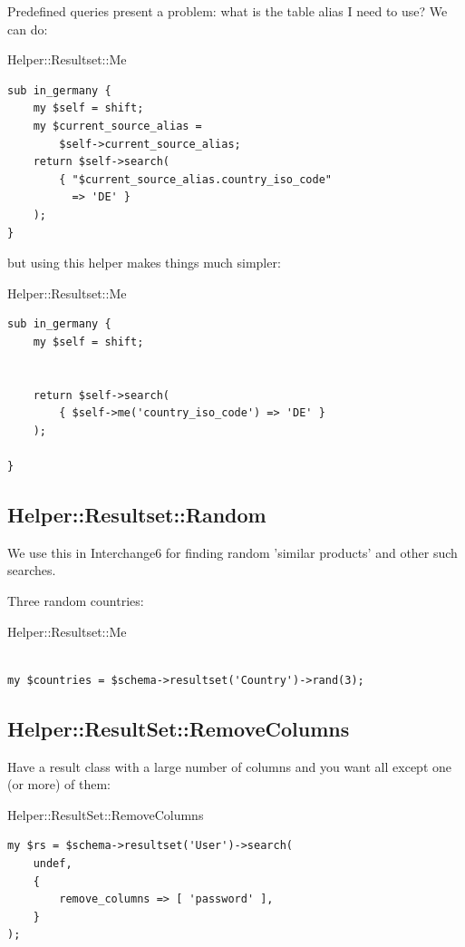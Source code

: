 Predefined queries present a problem: what is the table alias I need to use?
We can do:

\begin{frame}[fragile]{Helper::Resultset::Me}
\begin{lstlisting}
sub in_germany {
    my $self = shift;
    my $current_source_alias =
        $self->current_source_alias;
    return $self->search(
        { "$current_source_alias.country_iso_code"
          => 'DE' }
    );
}
\end{lstlisting}
\end{frame}

but using this helper makes things much simpler:

\begin{frame}[fragile]{Helper::Resultset::Me}
\begin{lstlisting}
sub in_germany {
    my $self = shift;


    return $self->search(
        { $self->me('country_iso_code') => 'DE' }
    );

}
\end{lstlisting}
\end{frame}

\subsection{Helper::Resultset::Random}

We use this in Interchange6 for finding random 'similar products' and other
such searches.

Three random countries:

\begin{frame}[fragile]{Helper::Resultset::Me}
\begin{lstlisting}

my $countries = $schema->resultset('Country')->rand(3);

\end{lstlisting}
\end{frame}

\subsection{Helper::ResultSet::RemoveColumns}
Have a result class with a large number of columns and you want all except
one (or more) of them:

\begin{frame}[fragile]{Helper::ResultSet::RemoveColumns}
\begin{lstlisting}
my $rs = $schema->resultset('User')->search(
    undef,
    {
        remove_columns => [ 'password' ],
    }
);
\end{lstlisting}
\end{frame}

